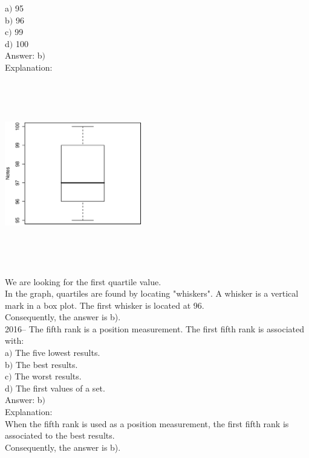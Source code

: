 \documentclass[letterpaper, 12pt]{article}
\begin{document}
a$)$ 95\\
b$)$ 96\\
c$)$ 99\\
d$)$ 100\\

Answer: b$)$\\

Explanation:
\begin{center}
 \includegraphics[width=6cm,height=8cm,angle=-90]{Q2015.eps}
\end{center}
We are looking for the first quartile value.\\
In the graph, quartiles are found by locating "whiskers". A whisker is a vertical mark in a box plot. The first whisker is located at 96.\\
Consequently, the answer is b).\\


2016-- The fifth rank is a position measurement. The first fifth rank is associated with:\\

a$)$ The five lowest results.\\
b$)$ The best results.\\
c$)$ The worst results.\\
d$)$ The first values of a set.\\

Answer: b$)$\\

Explanation:\\
When the fifth rank is used as a position measurement, the first fifth rank is associated to the best results.\\
Consequently, the answer is b).\\
\end{document}
